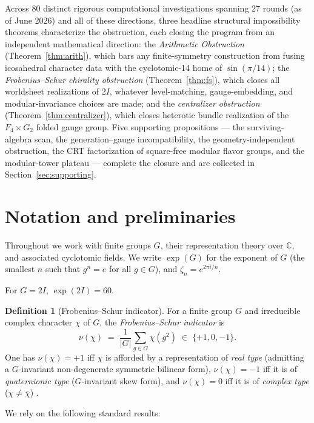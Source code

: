 \documentclass[11pt,a4paper]{amsart}
\theoremstyle{definition}
\newtheorem{definition}[theorem]{Definition}
\theoremstyle{remark}
\newcommand{\bbC}{\mathbb{C}}
\begin{document}
Across 80 distinct rigorous computational investigations spanning 27 rounds
(as of June 2026) and all of these directions, three headline structural
impossibility theorems characterize the obstruction, each closing the program
from an independent mathematical direction: the \emph{Arithmetic Obstruction}
(Theorem~\ref{thm:arith}), which bars any finite-symmetry construction from
fusing icosahedral character data with the cyclotomic-14 home of
$\sin(\pi/14)$; the \emph{Frobenius--Schur chirality obstruction}
(Theorem~\ref{thm:fs}), which closes all worldsheet realizations of $2I$,
whatever level-matching, gauge-embedding, and modular-invariance choices are
made; and the \emph{centralizer obstruction} (Theorem~\ref{thm:centralizer}),
which closes heterotic bundle realization of the $F_4 \times G_2$ folded
gauge group. Five supporting propositions --- the surviving-algebra scan, the
generation--gauge incompatibility, the geometry-independent obstruction, the
CRT factorization of square-free modular flavor groups, and the modular-tower
plateau --- complete the closure and are collected in Section~\ref{sec:supporting}.

\section{Notation and preliminaries}

Throughout we work with finite groups $G$, their representation theory over
$\bbC$, and associated cyclotomic fields. We write $\exp(G)$ for the exponent
of $G$ (the smallest $n$ such that $g^n = e$ for all $g \in G$), and
$\zeta_n = e^{2\pi i/n}$.

For $G = 2I$, $\exp(2I) = 60$.

\begin{definition}[Frobenius--Schur indicator]\label{def:fs}
For a finite group $G$ and irreducible complex character $\chi$ of $G$, the
\emph{Frobenius--Schur indicator} is
\[ \nu(\chi) \;=\; \frac{1}{|G|} \sum_{g \in G} \chi(g^2) \;\in\; \{+1, 0, -1\}. \]
One has $\nu(\chi) = +1$ iff $\chi$ is afforded by a representation of
\emph{real type} (admitting a $G$-invariant non-degenerate symmetric
bilinear form), $\nu(\chi) = -1$ iff it is of \emph{quaternionic type}
($G$-invariant skew form), and $\nu(\chi) = 0$ iff it is of \emph{complex
type} ($\chi \ne \bar\chi$) \cite{Isaacs1976, ATLAS1985}.
\end{definition}

\medskip

We rely on the following standard results:
\end{document}
